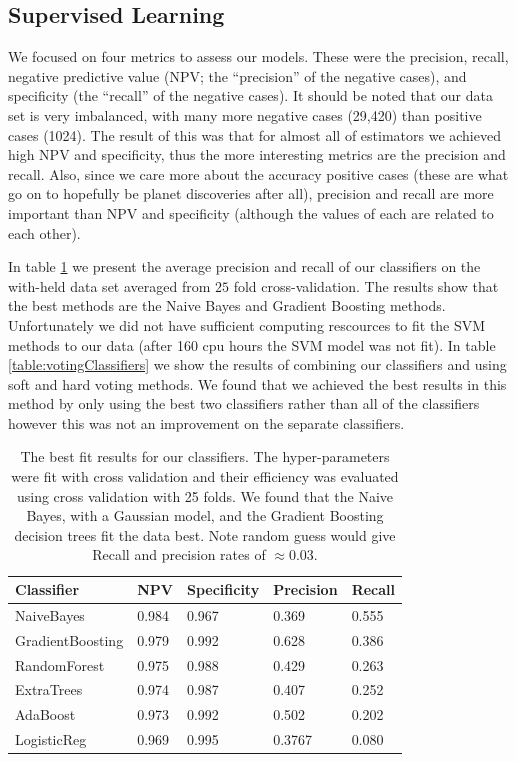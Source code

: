 \subsection{Supervised Learning}

We focused on four metrics to assess our models. These were the precision, recall, negative predictive value (NPV; the ``precision'' of the negative cases), and specificity (the ``recall'' of the negative cases).  It should be noted that our data set is very imbalanced, with many more negative cases (29,420) than positive cases (1024). The result of this was that for almost all of estimators we achieved high NPV and specificity, thus the more interesting metrics are the precision and recall.  Also, since we care more about the accuracy positive cases (these are what go on to hopefully be planet discoveries after all), precision and recall are more important than NPV and specificity (although the values of each are related to each other).

In table \ref{table:classifiers} we present the average precision and recall of our classifiers on the with-held data set averaged from $25$ fold cross-validation. The results show that the best methods are the Naive Bayes and Gradient Boosting methods.  Unfortunately we did not have sufficient computing rescources to fit the SVM methods to our data (after 160 cpu hours the SVM model was not fit). In table \ref{table:votingClassifiers} we show the results of combining our classifiers and using soft and hard voting methods. We found that we achieved the best results in this method by only using the best two classifiers rather than all of the classifiers however this was not an improvement on the separate classifiers. 
\begin{table}
\centering
 \begin{tabular}{|l |l |l |l |l |}
\hline
Classifier &NPV & Specificity &Precision & Recall  \\ \hline
 NaiveBayes & 0.984 &  0.967&  0.369 & 0.555 \\ 
GradientBoosting & 0.979 & 0.992 &  0.628 & 0.386\\
RandomForest & 0.975 &  0.988 & 0.429&  0.263 \\
ExtraTrees & 0.974 & 0.987 &  0.407& 0.252 \\
AdaBoost & 0.973&  0.992 & 0.502& 0.202 \\
LogisticReg &0.969 &  0.995& 0.3767 &  0.080\\\hline
\end{tabular}
\caption{The best fit results for our classifiers. The hyper-parameters were fit with cross validation and their efficiency was evaluated using cross validation with 25 folds. We found that the Naive Bayes, with a Gaussian model, and the Gradient Boosting decision trees fit the data best. Note random guess would give Recall and precision rates of $\approx 0.03$. }
\label{table:classifiers}
\end{table}

